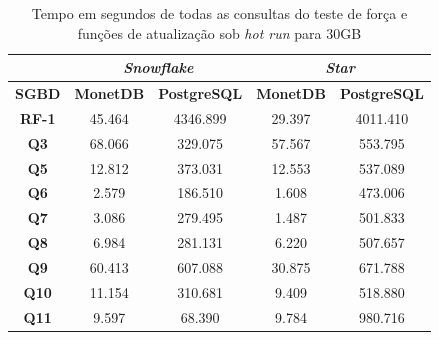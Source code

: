 \begin{table}[t]
        \centering
        \caption{Tempo em segundos de todas as consultas do teste de força e funções de atualização sob \textit{hot run} para 30GB}
        \label{tab:queries_hot_30}
        \begin{tabular}{|c|c|c|c|c|} 
                \cline{2-5}
                \multicolumn{1}{c|}{} & \multicolumn{2}{c|}{\textit{\textbf{Snowflake}} } & \multicolumn{2}{c|}{\textit{\textbf{Star}} }  \\ 
                \hline
                 \textbf{SGBD}        & \textbf{MonetDB}  & \textbf{PostgreSQL}           & \textbf{MonetDB}  & \textbf{PostgreSQL}       \\ 
                \hline
                 \textbf{RF-1}        & 45.464            & 4346.899                      & 29.397            & 4011.410                  \\ 
                \hline
                 \textbf{Q3}          & 68.066            & 329.075                       & 57.567            & 553.795                   \\ 
                \hline
                 \textbf{Q5}          & 12.812            & 373.031                       & 12.553            & 537.089                   \\ 
                \hline
                 \textbf{Q6}          & 2.579             & 186.510                       & 1.608             & 473.006                   \\ 
                \hline
                 \textbf{Q7}          & 3.086             & 279.495                       & 1.487             & 501.833                   \\ 
                \hline
                 \textbf{Q8}          & 6.984             & 281.131                       & 6.220             & 507.657                   \\ 
                \hline
                 \textbf{Q9}          & 60.413            & 607.088                       & 30.875            & 671.788                   \\ 
                \hline
                 \textbf{Q10}         & 11.154            & 310.681                       & 9.409             & 518.880                   \\ 
                \hline
                 \textbf{Q11}         & 9.597             & 68.390                        & 9.784             & 980.716                   \\ 
                \hline

\end{tabular}
\end{table}
